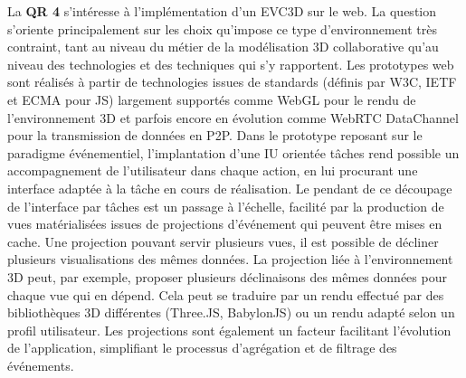La \textbf{QR 4} s'intéresse à l'implémentation d'un \gls{EVC3D} sur le web. La 
question s'oriente principalement sur les choix qu'impose ce type d'environnement 
très contraint, tant au niveau du métier de la modélisation 3D collaborative 
qu'au niveau des technologies et des techniques qui s'y rapportent.
Les prototypes web sont réalisés à partir de 
technologies issues de standards (définis par \gls{W3C}, \gls{IETF} et 
\acrshort{ECMA} 
pour \gls{JS}) largement supportés comme WebGL pour le rendu de 
l'environnement 3D et parfois encore en évolution comme WebRTC DataChannel 
pour la transmission de données en \gls{P2P}. 
Dans le prototype reposant sur le paradigme événementiel, l'implantation d'une 
\gls{IU} orientée tâches rend possible un accompagnement de l'utilisateur dans 
chaque action, en lui procurant une interface adaptée à la tâche en cours de 
réalisation. Le pendant de ce découpage de l'interface par tâches est un passage 
à l'échelle, facilité par la production de vues matérialisées issues de projections 
d'événement qui peuvent être mises en cache. Une projection pouvant servir 
plusieurs vues, il est possible de décliner plusieurs visualisations des mêmes 
données. La projection liée à l'environnement 3D peut, par exemple, proposer 
plusieurs déclinaisons des mêmes données pour chaque vue qui en dépend. Cela 
peut se traduire par un rendu effectué par des bibliothèques 3D différentes 
(Three.JS, BabylonJS) ou un rendu adapté selon un profil utilisateur. Les 
projections sont également un facteur facilitant l'évolution de l'application,
simplifiant le processus d'agrégation et de filtrage des événements.

